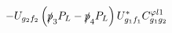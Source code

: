 %
\begin{dmath*}
%
  -  U_{g_2 f_2} \left(\slashed{p}_{3} P_L - \slashed{p}_{4} P_L\right) U_{g_1 f_1}^* C^{ \varphi  l1}_{g_1 g_2}
%
\end{dmath*}
%
